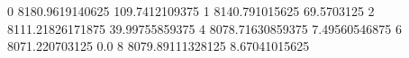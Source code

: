 0 8180.9619140625 109.7412109375
1 8140.791015625 69.5703125
2 8111.21826171875 39.99755859375
4 8078.71630859375 7.49560546875
6 8071.220703125 0.0
8 8079.89111328125 8.67041015625
